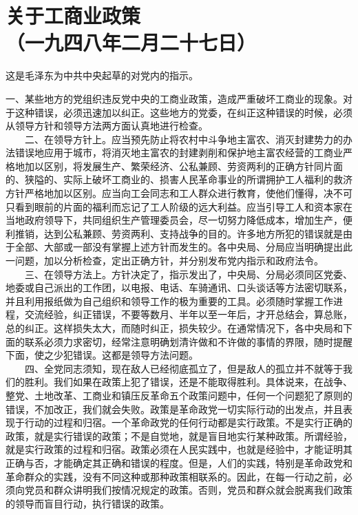 \documentclass[cn,11pt,chinese]{elegantbook}
\def\myformat#1{\hfil\hfil #1}
\begin{document}
\newpage\section*{\myformat{关于工商业政策}\\\myformat{（一九四八年二月二十七日）}}
\begin{introduction}\item  这是毛泽东为中共中央起草的对党内的指示。\end{introduction}
一、某些地方的党组织违反党中央的工商业政策，造成严重破坏工商业的现象。对于这种错误，必须迅速加以纠正。这些地方的党委，在纠正这种错误的时候，必须从领导方针和领导方法两方面认真地进行检查。\\
　　二、在领导方针上。应当预先防止将农村中斗争地主富农、消灭封建势力的办法错误地应用于城市，将消灭地主富农的封建剥削和保护地主富农经营的工商业严格地加以区别，将发展生产、繁荣经济、公私兼顾、劳资两利的正确方针同片面的、狭隘的、实际上破坏工商业的、损害人民革命事业的所谓拥护工人福利的救济方针严格地加以区别。应当向工会同志和工人群众进行教育，使他们懂得，决不可只看到眼前的片面的福利而忘记了工人阶级的远大利益。应当引导工人和资本家在当地政府领导下，共同组织生产管理委员会，尽一切努力降低成本，增加生产，便利推销，达到公私兼顾、劳资两利、支持战争的目的。许多地方所犯的错误就是由于全部、大部或一部没有掌握上述方针而发生的。各中央局、分局应当明确提出此一问题，加以分析检查，定出正确方针，并分别发布党内指示和政府法令。\\
　　三、在领导方法上。方针决定了，指示发出了，中央局、分局必须同区党委、地委或自己派出的工作团，以电报、电话、车骑通讯、口头谈话等方法密切联系，并且利用报纸做为自己组织和领导工作的极为重要的工具。必须随时掌握工作进程，交流经验，纠正错误，不要等数月、半年以至一年后，才开总结会，算总账，总的纠正。这样损失太大，而随时纠正，损失较少。在通常情况下，各中央局和下面的联系必须力求密切，经常注意明确划清许做和不许做的事情的界限，随时提醒下面，使之少犯错误。这都是领导方法问题。\\
　　四、全党同志须知，现在敌人已经彻底孤立了，但是敌人的孤立并不就等于我们的胜利。我们如果在政策上犯了错误，还是不能取得胜利。具体说来，在战争、整党、土地改革、工商业和镇压反革命五个政策问题中，任何一个问题犯了原则的错误，不加改正，我们就会失败。政策是革命政党一切实际行动的出发点，并且表现于行动的过程和归宿。一个革命政党的任何行动都是实行政策。不是实行正确的政策，就是实行错误的政策；不是自觉地，就是盲目地实行某种政策。所谓经验，就是实行政策的过程和归宿。政策必须在人民实践中，也就是经验中，才能证明其正确与否，才能确定其正确和错误的程度。但是，人们的实践，特别是革命政党和革命群众的实践，没有不同这种或那种政策相联系的。因此，在每一行动之前，必须向党员和群众讲明我们按情况规定的政策。否则，党员和群众就会脱离我们政策的领导而盲目行动，执行错误的政策。\\
\end{document}
